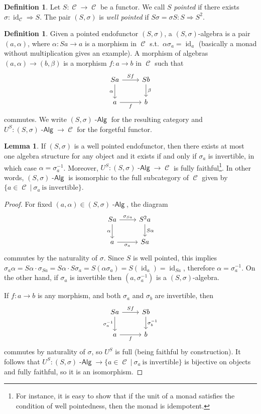 \documentclass[a4paper,11pt,oneside,openany]{scrbook}
\DeclareMathOperator{\Alg}{-\mathsf{Alg}}
\DeclareMathOperator{\C}{\mathcal{C}}
\DeclareMathOperator{\id}{id}
\theoremstyle{definition}
\theoremstyle{definition}
\newtheorem{defn}[thm]{Definition} %
\newtheorem{lemma}[thm]{Lemma}
\begin{document}
\begin{defn}
	Let $S\colon\C\to\C$ be a functor. We call $S$ \emph{pointed} if there exists $\sigma\colon\id_{\C}\Rightarrow S$. The pair $(S,\sigma)$ is \emph{well pointed} if $S\sigma=\sigma S\colon S\Rightarrow S^2$.
\end{defn}
\begin{defn}
	Given a pointed endofunctor $(S,\sigma)$, a $(S,\sigma)$-algebra is a pair $(a,\alpha)$, where $\alpha\colon Sa\to a$ is a morphism in $\C$ s.t.\ $\alpha\sigma_a=\id_a$ (basically a monad without multiplication gives an example). A morphism of algebras $(a,\alpha)\to(b,\beta)$ is a morphism $f\colon a\to b$ in $\C$ such that
	\[
	\begin{tikzcd}
	Sa\arrow["\alpha"']{d}\arrow["Sf"]{r}
	& Sb\arrow["\beta"]{d} \\
	a\arrow["f"']{r}
	& b
	\end{tikzcd}
	\]
	commutes. We write $(S,\sigma)\Alg$ for the resulting category and $U^S\colon(S,\sigma)\Alg\to\C$ for the forgetful functor.
\end{defn}
\begin{lemma}
	If $(S,\sigma)$ is a well pointed endofunctor, then there exists at most one algebra structure for any object and it exists if and only if $\sigma_a$ is invertible, in which case $\alpha=\sigma_a^{-1}$. Moreover, $U^S\colon(S,\sigma)\Alg\to\C$ is fully faithful\footnote{For instance, it is easy to show that if the unit of a monad satisfies the condition of well pointedness, then the monad is idempotent.}. In other words, $(S,\sigma)\Alg$ is isomorphic to the full subcategory of $\C$ given by $\{a\in\C\ |\ \sigma_a \ \text{is invertible} \}$.
\end{lemma}
\begin{proof}
	For fixed $(a,\alpha)\in(S,\sigma)\Alg$, the diagram
	\[
	\begin{tikzcd}
	Sa\arrow["\alpha"']{d}\arrow["\sigma_{Sa}"]{r}
	& S^2a\arrow["S\alpha"]{d} \\
	a\arrow["\sigma_a"']{r}
	& Sa
	\end{tikzcd}
	\] 
	commutes by the naturality of $\sigma$. Since $S$ is well pointed, this implies $\sigma_a \alpha=S\alpha\cdot\sigma_{Sa}=S\alpha\cdot S\sigma_a=S(\alpha\sigma_a)=S(\id_a)=\id_{Sa}$, therefore $\alpha=\sigma_a^{-1}$. On the other hand, if $\sigma_a$ is invertible then $(a,\sigma_a^{-1})$ is a $(S,\sigma)$-algebra.
	
	If $f\colon a\to b$ is any morphism, and both $\sigma_a$ and $\sigma_b$ are invertible, then 
		\[
	\begin{tikzcd}
	Sa\arrow["\sigma_a^{-1}"']{d}\arrow["Sf"]{r}
	& Sb\arrow["\sigma_b^{-1}"]{d} \\
	a\arrow["f"']{r}
	& b
	\end{tikzcd}
	\] 
	commutes by naturality of $\sigma$, so $U^S$ is full (being faithful by construction). It follows that $U^S\colon(S,\sigma)\Alg\to\{a\in\C\ |\ \sigma_a \ \text{is invertible}\}$ is bijective on objects and fully faithful, so it is an isomorphism.
\end{proof}
\end{document}
